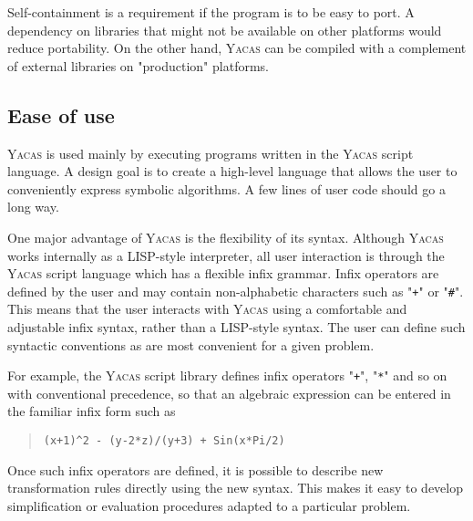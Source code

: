 \documentclass{llncs}
\begin{document}
Self-containment is a requirement if the program is to be easy to port. A
dependency on libraries that might not be available on other platforms would
reduce portability. On the other hand, \textsc{Yacas} can be compiled with a complement
of external libraries on "production" platforms.


\subsection*{Ease of use}
\textsc{Yacas} is used mainly by executing programs written in the \textsc{Yacas} script
language. A design goal is to create a high-level language that allows the user
to conveniently express symbolic algorithms. A few lines of user code should go
a long way.


One major advantage of \textsc{Yacas} is the flexibility of its syntax. Although \textsc{Yacas}
works internally as a LISP-style interpreter, all user interaction is through
the \textsc{Yacas} script language which has a flexible infix grammar. Infix operators
are defined by the user and may contain non-alphabetic characters such as "\texttt{+}"
or "\verb|#|". This means that the user interacts with \textsc{Yacas} using a comfortable and adjustable infix syntax,
rather than a LISP-style syntax. The user can define such syntactic
conventions as are most convenient for a given problem.


For example, the \textsc{Yacas} script library defines infix operators "\texttt{+}", "\texttt{*}" and so
on with conventional precedence, so that an algebraic expression can be entered
in the familiar infix form such as


\begin{quote}\small\begin{verbatim}
(x+1)^2 - (y-2*z)/(y+3) + Sin(x*Pi/2)
\end{verbatim}\end{quote}


Once such infix operators are defined, it is possible to describe new
transformation rules directly using the new syntax. This makes it easy to
develop simplification or evaluation procedures adapted to a particular
problem.
\end{document}
